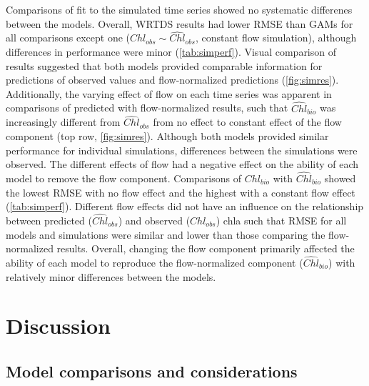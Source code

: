 \documentclass[letterpaper,12pt,oneside]{article}\usepackage[]{graphicx}\usepackage[]{color}
\begin{document}
Comparisons of fit to the simulated time series showed no systematic differenes between the models.  Overall, \ac{WRTDS} results had lower \ac{RMSE} than \acp{GAM} for all comparisons except one ($Chl_{obs} \sim \widehat{Chl}_{obs}$, constant flow simulation), although differences in performance were minor (\cref{tab:simperf}).  Visual comparison of results suggested that both models provided comparable information for predictions of observed values and flow-normalized predictions (\cref{fig:simres}).  Additionally, the varying effect of flow on each time series was apparent in comparisons of predicted with flow-normalized results, such that $\widehat{Chl}_{bio}$ was increasingly different from $\widehat{Chl}_{obs}$ from no effect to constant effect of the flow component (top row, \cref{fig:simres}).  Although both models provided similar performance for individual simulations, differences between the simulations were observed.  The different effects of flow had a negative effect on the ability of each model to remove the flow component.  Comparisons of $Chl_{bio}$ with $\widehat{Chl}_{bio}$ showed the lowest \ac{RMSE} with no flow effect and the highest with a constant flow effect (\cref{tab:simperf}).  Different flow effects did not have an influence on the relationship between predicted ($\widehat{Chl}_{obs}$) and observed ($Chl_{obs}$) \ac{chla} such that \ac{RMSE} for all models and simulations were similar and lower than those comparing the flow-normalized results.  Overall, changing the flow component primarily affected the ability of each model to reproduce the flow-normalized component ($\widehat{Chl}_{bio}$) with relatively minor differences between the models. 

\section{Discussion}

\subsection{Model comparisons and considerations}
\end{document}
